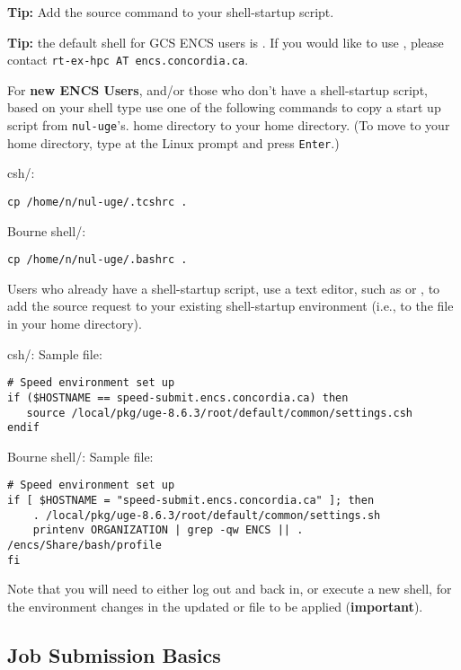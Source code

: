 \documentclass{easychair}
\begin{document}
\textbf{Tip:} Add the source command to your shell-startup script. 

\textbf{Tip:} the default shell for GCS ENCS users is .
If you would like to use , please contact 
\texttt{rt-ex-hpc AT encs.concordia.ca}.

For \textbf{new ENCS Users}, and/or those who don't have a shell-startup script, 
based on your shell type use one of the following commands to copy a start up script 
from \texttt{nul-uge}'s. home directory to your home directory. (To move to your home
directory, type  at the Linux prompt and press \texttt{Enter}.)

csh/:
\begin{verbatim}
cp /home/n/nul-uge/.tcshrc . 
\end{verbatim}

Bourne shell/:
\begin{verbatim}
cp /home/n/nul-uge/.bashrc . 
\end{verbatim}

Users who already have a shell-startup script, use a text editor, such as
 or , to add the source request to your existing
shell-startup environment (i.e., to the  file in your home directory). 

csh/:
Sample  file:
\begin{verbatim}
# Speed environment set up 
if ($HOSTNAME == speed-submit.encs.concordia.ca) then
   source /local/pkg/uge-8.6.3/root/default/common/settings.csh
endif
\end{verbatim}

Bourne shell/:
Sample  file:
\begin{verbatim}
# Speed environment set up 
if [ $HOSTNAME = "speed-submit.encs.concordia.ca" ]; then
    . /local/pkg/uge-8.6.3/root/default/common/settings.sh
    printenv ORGANIZATION | grep -qw ENCS || . /encs/Share/bash/profile
fi
\end{verbatim}

Note that you will need to either log out and back in, or execute a new shell, 
for the environment changes in the updated  or  file to be applied 
(\textbf{important}).

\subsection{Job Submission Basics}
\end{document}
